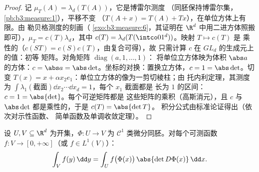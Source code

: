 \begin{proof}
记 $\mu_T(A) = \lambda_d(T(A))$，它是博雷尔测度
（同胚保持博雷尔集，
\cref{pb:b3:measure:1}），平移不变
（$T(A + x) = T(A) + Tx$），在单位方体上有限。由
勒贝格测度的刻画（
\cref{exo:b3:measure:6}，其证明在
$\R^d$ 中用二进方体照搬即可），$\mu_T = c(T)\lambda_d$，其中 $c(T)
= \lambda_d(T(\intco01^d))$。映射 $T \mapsto c(T)$ 是
乘性的（$c(ST) = c(S)c(T)$，由复合可得），故
只需计算 $c$ 在 $GL_d$ 的生成元上的值：初等
矩阵。对角矩阵 $\operatorname{diag}(a, 1, \dots, 1)$：
将单位立方体映为体积 $\abs a$ 的方体：$c = \abs a =
\abs\det$。坐标的对换：置换立方体，$c
= 1 = \abs\det$。切变 $T(x) = x + \alpha
x_2e_1$：单位立方体的像为一剪切棱柱；由
托内利定理，其测度为 $\int\lambda_1(\text{截面})\dd x_2
\cdots \dd x_d = 1$，每个 $x_1$ 截面都是
长为 $1$ 的区间：$c = 1 = \abs{\det}$。每个可逆矩阵都是
这些矩阵的乘积（高斯消元），且 $c$ 与
$\abs\det$ 都是乘性的，于是 $c(T) = \abs{\det T}$。
积分公式由标准论证得出（依次对示性函数、
简单函数及单调收敛定理）。
\end{proof}

\begin{theorem}[变量替换]\label{thm:b3:product:changeofvar}
设 $U, V \subseteq \R^d$ 为开集，$\Phi \colon U \to V$ 为
$\mathcal C^1$ 类微分同胚。对每个可测函数 $f \colon V
\to [0, +\infty]$（或 $f \in L^1(V)$）：
\[
\int_V f(y)\,\dd y = \int_U
f\bigl(\Phi(x)\bigr)\,\abs{\det D\Phi(x)}\,\dd x .
\]
\end{theorem}


